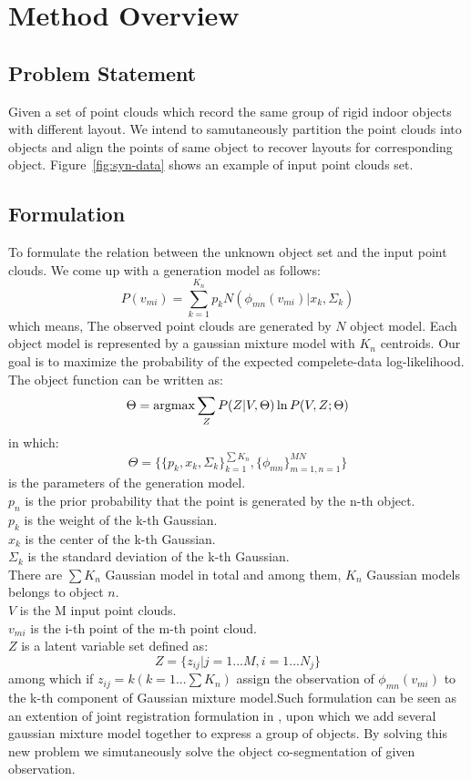 \section{Method Overview}
\label{sec:method}
\subsection{Problem Statement}
Given a set of point clouds which record the same group of rigid indoor objects with different layout. We intend to samutaneously partition the point clouds into objects and align the points of same object to recover layouts for corresponding object. Figure~\ref{fig:syn-data} shows an example of input point clouds set.
\subsection{Formulation}
To formulate the relation between the unknown object set and the input point clouds. We come up with a generation model as follows:
\begin{equation}
\label{equ:model}
P(v_{mi})=\sum^{K_n}_{k=1}p_kN(\phi_{mn}(v_{mi})|x_k,\Sigma_k)
\end{equation}
which means,
The observed point clouds are generated by $N$ object model. 
Each object model is represented by a gaussian mixture model with $K_n$ centroids.
Our goal is to maximize the probability of the expected compelete-data log-likelihood. 
The object function can be written as:
\begin{equation}
\label{equ:obj0}
\Theta=\operatorname*{argmax}{\sum_ZP(Z|V,\Theta)\ln{P(V,Z;\Theta)}}
\end{equation}
in which:
$$\Theta=\{\{p_k,x_k,\Sigma_k\}_{k=1}^{\sum{K_n}},\{\phi_{mn}\}_{m=1,n=1}^{MN}\}$$
is the parameters of the generation model.\\
$p_n$ is the prior probability that the point is generated by the n-th object.\\
$p_k$ is the weight of the k-th Gaussian.\\
$x_k$ is the center of the k-th Gaussian.\\
$\Sigma_k$ is the standard deviation of the k-th Gaussian.\\
There are $\sum{K_n}$ Gaussian model in total and among them, $K_n$ Gaussian models belongs to object $n$.\\
$V$ is the M input point clouds.\\
$v_{mi}$ is the i-th point of the m-th point cloud.\\
$Z$ is a latent variable set defined as:\\
$$Z=\{z_{ij}|j=1...M,i=1...N_j\}$$
among which if $z_{ij}=k(k=1...\sum{K_n})$ assign the observation of $\phi_{mn}(v_{mi})$ to the k-th component of Gaussian mixture model.Such formulation can be seen as an extention of joint registration formulation in \cite{Evangelidis2014}, upon which we add several gaussian mixture model together to express a group of objects. By solving this new problem we simutaneously solve  the object co-segmentation of given observation.